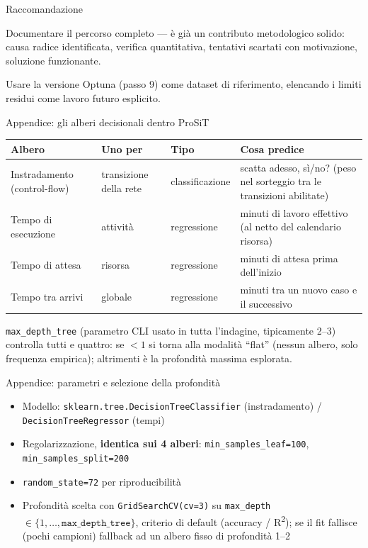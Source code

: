 \documentclass[11pt,aspectratio=169]{beamer}
\begin{document}
\begin{frame}{Raccomandazione}
\begin{block}{}
Documentare il percorso completo --- \`e gi\`a un contributo metodologico solido: causa radice identificata, verifica quantitativa, tentativi scartati con motivazione, soluzione funzionante.
\end{block}
\vspace{1em}
Usare la versione Optuna (passo 9) come dataset di riferimento, elencando i limiti residui come lavoro futuro esplicito.
\end{frame}

\begin{frame}{Appendice: gli alberi decisionali dentro ProSiT}
\centering
\scriptsize
\begin{tabular}{lllp{4.7cm}}
\toprule
\textbf{Albero} & \textbf{Uno per} & \textbf{Tipo} & \textbf{Cosa predice} \\
\midrule
Instradamento (control-flow) & transizione della rete & classificazione & scatta adesso, s\`i/no? (peso nel sorteggio tra le transizioni abilitate) \\
Tempo di esecuzione & attivit\`a & regressione & minuti di lavoro effettivo (al netto del calendario risorsa) \\
Tempo di attesa & risorsa & regressione & minuti di attesa prima dell'inizio \\
Tempo tra arrivi & globale & regressione & minuti tra un nuovo caso e il successivo \\
\bottomrule
\end{tabular}
\vspace{0.8em}

{\small \texttt{max\_depth\_tree} (parametro CLI usato in tutta l'indagine, tipicamente 2--3) controlla tutti e quattro: se $<1$ si torna alla modalit\`a ``flat'' (nessun albero, solo frequenza empirica); altrimenti \`e la profondit\`a massima esplorata.}
\end{frame}

\begin{frame}{Appendice: parametri e selezione della profondit\`a}
\begin{itemize}
\item Modello: \texttt{sklearn.tree.DecisionTreeClassifier} (instradamento) / \texttt{DecisionTreeRegressor} (tempi)
\item Regolarizzazione, \textbf{identica sui 4 alberi}: \texttt{min\_samples\_leaf=100}, \texttt{min\_samples\_split=200} 
\item \texttt{random\_state=72} per riproducibilit\`a
\item Profondit\`a scelta con \texttt{GridSearchCV(cv=3)} su \texttt{max\_depth} $\in\{1,\dots,\texttt{max\_depth\_tree}\}$, criterio di default (accuracy / R\textsuperscript{2}); se il fit fallisce (pochi campioni) fallback ad un albero fisso di profondit\`a 1--2
\end{itemize}
\end{frame}
\end{document}
